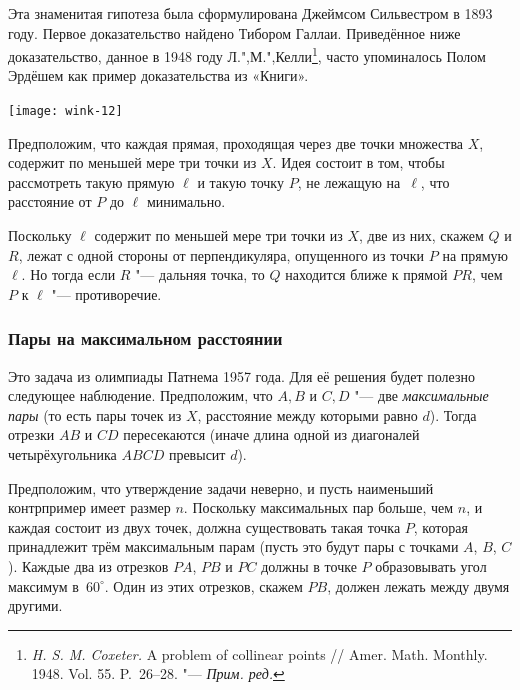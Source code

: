 \documentclass[twoside]{book}
\begin{document}
Эта знаменитая гипотеза была сформулирована Джеймсом Сильвестром в 1893 году.
Первое доказательство найдено Тибором Галлаи. %
Приведённое ниже доказательство, данное в 1948 году Л.",М.",Келли\footnote{\emph{H. S. M. Coxeter.} A problem of collinear points /\!/ {Amer. Math. Monthly}. 1948.  Vol. 55. P.~26--28. "--- \emph{Прим. ред.}}, 
часто упоминалось Полом Эрдёшем как пример доказательства из «Книги».

\hbox{\texttt{[image: wink-12]}}
\begin{figure}
\end{figure}

Предположим, что каждая прямая, проходящая через две точки множества $X$, содержит по меньшей мере три точки из $X$.
Идея состоит в том, чтобы рассмотреть такую прямую $\ell$ и такую точку $P$, не лежащую на~$\ell$, что расстояние от $P$ до $\ell$ минимально.


Поскольку $\ell$ содержит по меньшей мере три точки из $X$, две из них, скажем $Q$ и $R$, лежат с одной стороны от перпендикуляра, опущенного из точки $P$ на прямую $\ell$.
Но тогда если $R$ "--- дальняя точка, то $Q$ находится ближе к прямой $PR$, чем $P$ к $\ell$ "--- противоречие.\heart

\subsubsection*{Пары на максимальном расстоянии}%

Это задача из олимпиады Патнема 1957 года.
Для её решения будет полезно следующее наблюдение.
Предположим, что $A,B$ и $C,D$ "--- две \emph{максимальные пары} (то есть пары точек из $X$, расстояние между которыми равно $d$).
Тогда отрезки $AB$ и $CD$ пересекаются (иначе длина одной из диагоналей четырёхугольника $ABCD$ превысит $d$).

Предположим, что утверждение задачи неверно, и пусть наименьший
контрпример имеет размер $n$.
Поскольку максимальных пар больше, чем
$n$, и каждая состоит из двух точек, должна существовать такая точка
$P$, которая принадлежит трём максимальным парам (пусть это будут пары
с точками $A$, $B$, $C$).
Каждые два из отрезков $PA$, $PB$ и $PC$
должны в точке $P$ образовывать угол максимум в~$60^\circ$.
Один из
этих отрезков, скажем $PB$, 
должен лежать между двумя
другими.
\end{document}
